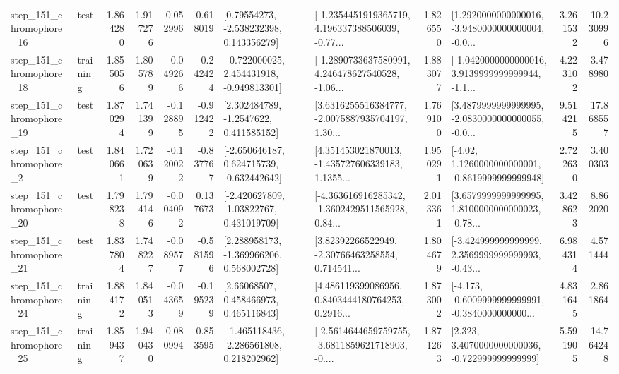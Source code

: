 \begin{tabular}{llrrrrllrlrr}
  step\_151\_chromophore\_16 &      test &      1.864280 &    1.917276 &      0.052996 &  0.618019 &     [0.79554273, -2.538232398, 0.143356279] &  [-1.2354451919365719, 4.196337388506039, -0.77... &       1.826550 &  [1.2920000000000016, -3.9480000000000004, -0.0... &            3.261532 &         10.230996 \\
  step\_151\_chromophore\_18 &  training &      1.855056 &    1.805789 &     -0.049266 & -0.242424 &   [-0.722000025, 2.454431918, -0.949813301] &  [-1.2890733637580991, 4.246478627540528, -1.06... &       1.883077 &  [-1.0420000000000016, 3.9139999999999944, -1.1... &            4.223102 &          3.478980 \\
  step\_151\_chromophore\_19 &      test &      1.870294 &    1.741399 &     -0.128895 & -0.912422 &      [2.302484789, -1.2547622, 0.411585152] &  [3.6316255516384777, -2.0075887935704197, 1.30... &       1.769100 &  [3.4879999999999995, -2.0830000000000055, -0.0... &            9.514215 &         17.868557 \\
   step\_151\_chromophore\_2 &      test &      1.840661 &    1.720639 &     -0.120022 & -0.837767 &   [-2.650646187, 0.624715739, -0.632442642] &  [4.351453021870013, -1.435727606339183, 1.1355... &       1.950291 &   [-4.02, 1.1260000000000001, -0.8619999999999948] &            2.722630 &          3.400303 \\
  step\_151\_chromophore\_20 &      test &      1.798238 &    1.794146 &     -0.004092 &  0.137673 &    [-2.420627809, -1.03822767, 0.431019709] &  [-4.363616916285342, -1.3602429511565928, 0.84... &       2.013361 &  [3.6579999999999995, 1.8100000000000023, -0.78... &            3.428623 &          8.862020 \\
  step\_151\_chromophore\_21 &      test &      1.837804 &    1.748227 &     -0.089577 & -0.581596 &    [2.288958173, -1.369966206, 0.568002728] &  [3.82392266522949, -2.30766463258554, 0.714541... &       1.804679 &  [-3.424999999999999, 2.3569999999999993, -0.43... &            6.984314 &          4.571444 \\
  step\_151\_chromophore\_24 &  training &      1.884172 &    1.840513 &     -0.043659 & -0.195239 &      [2.66068507, 0.458466973, 0.465116843] &  [4.486119399086956, 0.8403444180764253, 0.2916... &       1.873002 &  [-4.173, -0.6009999999999991, -0.3840000000000... &            4.831645 &          2.861864 \\
  step\_151\_chromophore\_25 &  training &      1.859437 &    1.940430 &      0.080994 &  0.853595 &   [-1.465118436, -2.286561808, 0.218202962] &  [-2.5614644659759755, -3.6811859621718903, -0.... &       1.871263 &    [2.323, 3.4070000000000036, -0.722999999999999] &            5.591905 &         14.764248 \\

\end{tabular}
